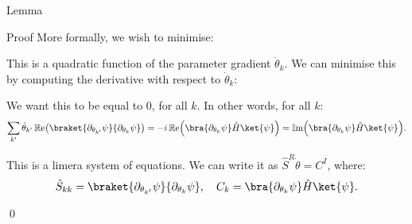 \documentclass[a4paper]{article}
\begin{document}
\begin{parag}{Lemma}
\begin{subparag}{Proof}
        More formally, we wish to minimise:
        
        This is a quadratic function of the parameter gradient $\dot{\theta}_k$. We can minimise this by computing the derivative with respect to $\dot{\theta}_k$: 

        We want this to be equal to $0$, for all $k$. In other words, for all $k$:
        \[\sum_{k'} \dot{\theta}_{k'} \cre\left(\braket{\partial_{\theta_{k'}}\psi}{\partial_{\theta_k}\psi}\right) = -i\cre\left(\bra{\partial_{\theta_k} \psi} \hat{H} \ket{\psi}\right) = \cim\left(\bra{\partial_{\theta_k} \psi} \hat{H} \ket{\psi}\right).\]

        This is a limera system of equations. We can write it as $\hat{S}^R \dot{\theta} = C^I$, where: 
        \[\hat{S}_{kk} = \braket{\partial_{\theta_{k'}}\psi}{\partial_{\theta_k}\psi}, \mathspace C_k = \bra{\partial_{\theta_k} \psi} \hat{H} \ket{\psi}.\]
        
        \qed
    \end{subparag}
\end{parag}
\end{document}
